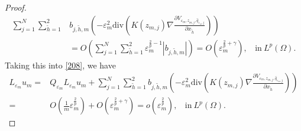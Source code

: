 \documentclass[12pt,reqno]{amsart}
\numberwithin{equation}{section}
\theoremstyle{definition}
\theoremstyle{remark}
\begin{document}
\begin{proof}
\begin{equation*}
\begin{split}
\sum_{j=1}^N\sum_{\tilde{h}=1}^2&b_{j,\tilde{h},m}\left( -\varepsilon_m^2\text{div}\left (K(z_{m,j})\nabla   \frac{\partial V_{\varepsilon_m, z_{m,j},\hat{q}_{\varepsilon_m,j}}}{\partial x_{\tilde{h}}}\right )\right)\\
&=O\left( \sum_{j=1}^N\sum_{\tilde{h}=1}^2\varepsilon_m^{\frac{2}{p}-1}|b_{j,\tilde{h},m}|\right)
=O\left( \varepsilon_m^{\frac{2}{p}+\gamma}\right),\ \ \ \ \text{in}\ L^p(\Omega).
\end{split}
\end{equation*}
Taking this into \eqref{208}, we have
\begin{equation}\label{307}
\begin{split}
L_{\varepsilon_m} u_m=&Q_{\varepsilon_m} L_{\varepsilon_m} u_m+\sum_{j=1}^N\sum_{\tilde{h}=1}^2b_{j,\tilde{h},m}\left( -\varepsilon_m^2\text{div}\left (K(z_{m,j})\nabla   \frac{\partial V_{\varepsilon_m, z_{m,j},\hat{q}_{\varepsilon_m,j}}}{\partial x_{\tilde{h}}}\right )\right)\\
=&O\left( \frac{1}{m}\varepsilon_m^{\frac{2}{p}}\right) +O\left(  \varepsilon_m^{\frac{2}{p}+\gamma}\right)
=o\left( \varepsilon_m^{\frac{2}{p}}\right),\ \ \ \ \text{in}\ L^p(\Omega).
\end{split}
\end{equation}


\end{proof}
\end{document}
